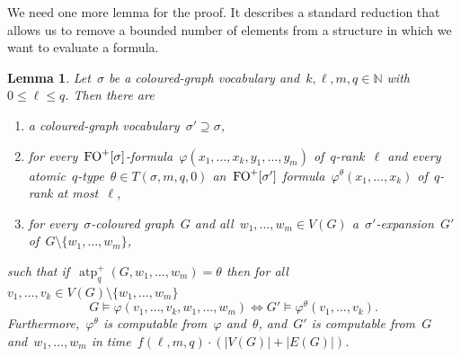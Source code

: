 \documentclass[11pt]{article}
\newtheorem{lemma}[theorem]{Lemma}
\numberwithin{equation}{section}
\newcommand{\FO}{\textup{FO}}
\newcommand{\atp}{\operatorname{atp}^+}
\renewcommand{\phi}{\varphi}
\begin{document}
We need one more lemma for the proof. It describes a standard
reduction that allows us to remove a bounded number of elements from a
structure in which we want to evaluate a formula.

\begin{lemma}\label{lem:redlem}
  Let~$\sigma$ be a coloured-graph vocabulary
  and~$k,\ell,m,q\in\mathbb N$ with~$0\le\ell\le q$. Then there are
  \begin{enumerate}
  \item a coloured-graph vocabulary~$\sigma'\supseteq\sigma$,
  \item for
    every~$\FO^+[\sigma]$-formula~$\phi(x_1,\ldots,x_k,y_1,\ldots,y_m)$
    of~$q$-rank~$\ell$ and every atomic~$q$-type~$\theta\in
    T(\sigma,m,q,0)$ an~$\FO^+[\sigma']$
    formula~$\phi^\theta(x_1,\ldots,x_k)$ of~$q$-rank at most~$\ell$,

  \item for every~$\sigma$-coloured graph~$G$ and
    all~$w_1,\ldots,w_m\in V(G)$ a~$\sigma'$-expansion~$G'$
    of~$G\setminus\{w_1,\ldots,w_m\}$,
  \end{enumerate}
  such that if~$\atp_q(G,w_1,\ldots,w_m)=\theta$ then for
  all~$v_1,\ldots,v_k\in V(G)\setminus\{w_1,\ldots,w_m\}$
  \[
  G\models\phi(v_1,\ldots,v_k,w_1,\ldots,w_m)\iff
  G'\models\phi^\theta(v_1,\ldots,v_k).
  \]
  Furthermore,~$\phi^\theta$ is computable from~$\phi$ and~$\theta$,
  and~$G'$ is computable from~$G$ and~$w_1,\ldots,w_m$ in
  time~$f(\ell,m,q)\cdot(|V(G)|+|E(G)|)$.
\end{lemma}
\end{document}
